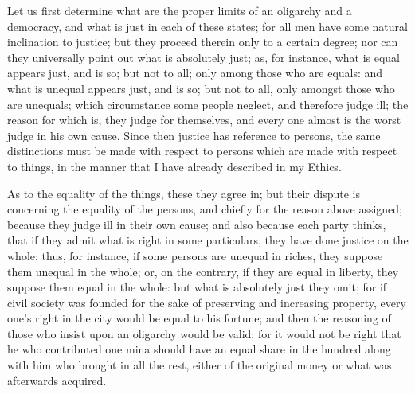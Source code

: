 
Let us first determine what are the proper limits of an oligarchy and a
democracy, and what is just in each of these states; for all men have some
natural inclination to justice; but they proceed therein only to a certain
degree; nor can they universally point out what is absolutely just; as,
for instance, what is equal appears just, and is so; but not to all; only
among those who are equals: and what is unequal appears just, and is so;
but not to all, only amongst those who are unequals; which circumstance
some people neglect, and therefore judge ill; the reason for which is,
they judge for themselves, and every one almost is the worst judge in his
own cause. Since then justice has reference to persons, the same
distinctions must be made with respect to persons which are made with
respect to things, in the manner that I have already described in my
Ethics.

As to the equality of the things, these they agree in; but their dispute
is concerning the equality of the persons, and chiefly for the reason
above assigned; because they judge ill in their own cause; and also
because each party thinks, that if they admit what is right in some
particulars, they have done justice on the whole: thus, for instance, if
some persons are unequal in riches, they suppose them unequal in the
whole; or, on the contrary, if they are equal in liberty, they suppose
them equal in the whole: but what is absolutely just they omit; for if
civil society was founded for the sake of preserving and increasing
property, every one's right in the city would be equal to his fortune; and
then the reasoning of those who insist upon an oligarchy would be valid;
for it would not be right that he who contributed one mina should have an
equal share in the hundred along with him who brought in all the rest,
either of the original money or what was afterwards acquired.

